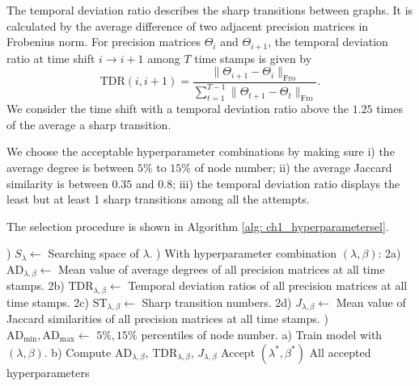 The temporal deviation ratio describes the sharp transitions between graphs. 
It is calculated by the average difference of two adjacent precision matrices in Frobenius norm. 
For precision matrices $\Theta_i$ and $\Theta_{i+1}$, the temporal deviation ratio at time shift $i\longrightarrow i+1$ among $T$ time stamps is given by
\begin{equation*}
    \text{TDR}(i, i+1) = \frac{\|\Theta_{i+1}-\Theta_i\|_{\text{Fro}}}{\sum_{t=1}^{T-1}\|\Theta_{t+1}-\Theta_{t}\|_{\text{Fro}}}.
\end{equation*} 
We consider the time shift with a temporal deviation ratio above the $1.25$ times of the average a sharp transition. 

We choose the acceptable hyperparameter combinations by making sure
i) the average degree is between $5\%$ to $15\%$ of node number; 
ii) the average Jaccard similarity is between $0.35$ and $0.8$;
iii) the temporal deviation ratio displays the least but at least 1 sharp transitions among all the attempts. 

The selection procedure is shown in Algorithm \ref{alg: ch1_hyperparametersel}. 

\begin{algorithm}
    \label{alg: ch1_hyperparametersel}
    \caption{Hyperparameter selection with warm start}
    \begin{algorithmic}
        ) $S_{\lambda}\longleftarrow$ Searching space of $\lambda$.
        ) With hyperparameter combination $(\lambda, \beta)$:
        \State \quad 2a) $\text{AD}_{\lambda,\beta}\longleftarrow$ Mean value of average degrees of all precision matrices at all time stamps.
        \State \quad 2b) $\text{TDR}_{\lambda,\beta}\longleftarrow$ Temporal deviation ratios of all precision matrices at all time stamps.
        \State \quad 2c) $\text{ST}_{\lambda,\beta}\longleftarrow$ Sharp transition numbers. 
        \State \quad 2d) $J_{\lambda,\beta}\longleftarrow$ Mean value of Jaccard similarities of all precision matrices at all time stamps.
        ) $\text{AD}_{\text{min}}, \text{AD}_{\text{max}}\longleftarrow$ $5\%, 15\%$ percentiles of node number. 
            \State a) Train model with $(\lambda, \beta)$.
            \State b) Compute $\text{AD}_{\lambda,\beta}$, $\text{TDR}_{\lambda,\beta}$, $J_{\lambda,\beta}$
            \EndFor
                \State Accept $(\lambda^*, \beta^*)$
            \EndIf
        \EndFor
        \State \Return All accepted hyperparameters
    \end{algorithmic}
\end{algorithm}